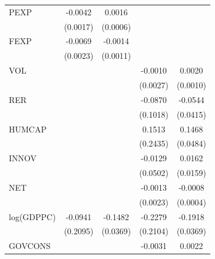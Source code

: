 {\begin{tabular}{l*{4}{c}}
\addlinespace
PEXP                &     -0.0042\sym{**} &      0.0016\sym{**} &                     &                     \\
                    &    (0.0017)         &    (0.0006)         &                     &                     \\
\addlinespace
FEXP                &     -0.0069\sym{***}&     -0.0014         &                     &                     \\
                    &    (0.0023)         &    (0.0011)         &                     &                     \\
\addlinespace
VOL                 &                     &                     &     -0.0010         &      0.0020\sym{*}  \\
                    &                     &                     &    (0.0027)         &    (0.0010)         \\
\addlinespace
RER                 &                     &                     &     -0.0870         &     -0.0544         \\
                    &                     &                     &    (0.1018)         &    (0.0415)         \\
\addlinespace
HUMCAP              &                     &                     &      0.1513         &      0.1468\sym{***}\\
                    &                     &                     &    (0.2435)         &    (0.0484)         \\
\addlinespace
INNOV               &                     &                     &     -0.0129         &      0.0162         \\
                    &                     &                     &    (0.0502)         &    (0.0159)         \\
\addlinespace
NET                 &                     &                     &     -0.0013         &     -0.0008\sym{*}  \\
                    &                     &                     &    (0.0023)         &    (0.0004)         \\
\addlinespace
log(GDPPC)          &     -0.0941         &     -0.1482\sym{***}&     -0.2279         &     -0.1918\sym{***}\\
                    &    (0.2095)         &    (0.0369)         &    (0.2104)         &    (0.0369)         \\
\addlinespace
GOVCONS             &                     &                     &     -0.0031         &      0.0022         \\

\end{tabular}}

